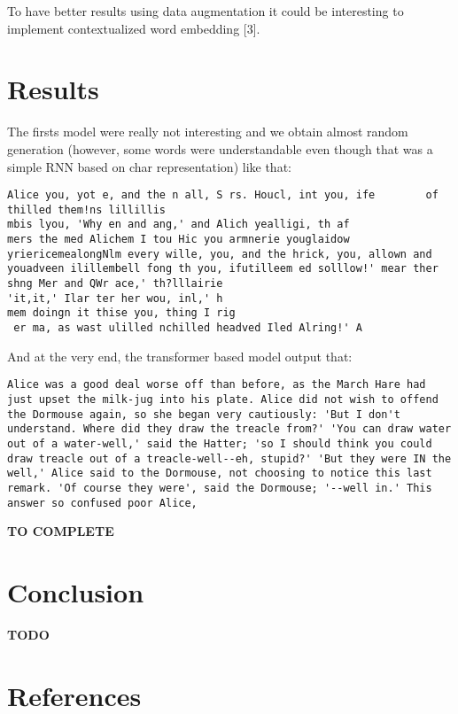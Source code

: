 \documentclass{article}
\begin{document}
To have better results using data augmentation it could be interesting to implement contextualized word embedding [3].



\section{Results}

The firsts model were really not interesting and we obtain almost random generation (however, some words were understandable even though that was a simple RNN based on char representation) like that:
\begin{lstlisting}[breaklines]
Alice you, yot e, and the n all, S rs. Houcl, int you, ife        of thilled them!ns lillillis
mbis lyou, 'Why en and ang,' and Alich yealligi, th af
mers the med Alichem I tou Hic you armnerie youglaidow yriericemealongNlm every wille, you, and the hrick, you, allown and youadveen ilillembell fong th you, ifutilleem ed solllow!' mear ther shng Mer and QWr ace,' th?lllairie
'it,it,' Ilar ter her wou, inl,' h
mem doingn it thise you, thing I rig
 er ma, as wast ulilled nchilled headved Iled Alring!' A
\end{lstlisting}

And at the very end, the transformer based model output that:
\begin{lstlisting}[breaklines]
Alice was a good deal worse off than before, as the March Hare had just upset the milk-jug into his plate. Alice did not wish to offend the Dormouse again, so she began very cautiously: 'But I don't understand. Where did they draw the treacle from?' 'You can draw water out of a water-well,' said the Hatter; 'so I should think you could draw treacle out of a treacle-well--eh, stupid?' 'But they were IN the well,' Alice said to the Dormouse, not choosing to notice this last remark. 'Of course they were', said the Dormouse; '--well in.' This answer so confused poor Alice,
\end{lstlisting}

\textbf{TO COMPLETE}

\section{Conclusion}

\textbf{TODO}

\newpage



\section*{References}
\end{document}
